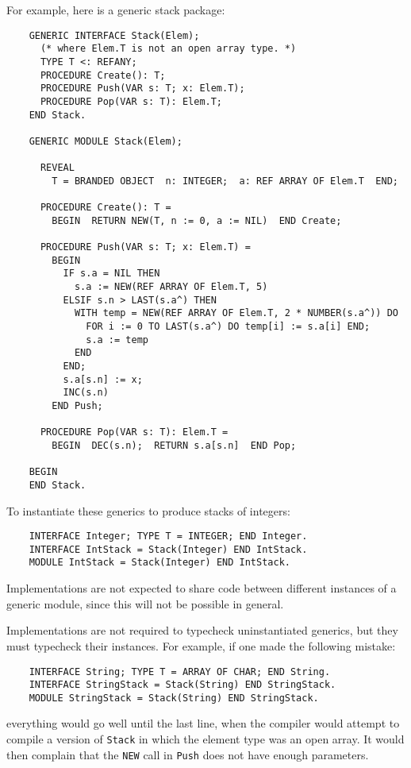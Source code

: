\documentclass[10pt]{article}
\begin{document}
For example, here is a generic stack package:
\begin{verbatim}
    GENERIC INTERFACE Stack(Elem);
      (* where Elem.T is not an open array type. *)
      TYPE T <: REFANY;
      PROCEDURE Create(): T;
      PROCEDURE Push(VAR s: T; x: Elem.T);
      PROCEDURE Pop(VAR s: T): Elem.T;
    END Stack.

    GENERIC MODULE Stack(Elem);

      REVEAL
        T = BRANDED OBJECT  n: INTEGER;  a: REF ARRAY OF Elem.T  END;

      PROCEDURE Create(): T =
        BEGIN  RETURN NEW(T, n := 0, a := NIL)  END Create;

      PROCEDURE Push(VAR s: T; x: Elem.T) =
        BEGIN
          IF s.a = NIL THEN
            s.a := NEW(REF ARRAY OF Elem.T, 5)
          ELSIF s.n > LAST(s.a^) THEN
            WITH temp = NEW(REF ARRAY OF Elem.T, 2 * NUMBER(s.a^)) DO
              FOR i := 0 TO LAST(s.a^) DO temp[i] := s.a[i] END;
              s.a := temp
            END
          END;
          s.a[s.n] := x;
          INC(s.n)
        END Push;

      PROCEDURE Pop(VAR s: T): Elem.T =
        BEGIN  DEC(s.n);  RETURN s.a[s.n]  END Pop;

    BEGIN
    END Stack.
\end{verbatim}
To instantiate these generics to produce stacks of integers:
\begin{verbatim}
    INTERFACE Integer; TYPE T = INTEGER; END Integer.
    INTERFACE IntStack = Stack(Integer) END IntStack.
    MODULE IntStack = Stack(Integer) END IntStack.
\end{verbatim}
Implementations are not expected to share code between different instances of
a generic module, since this will not be possible in general.

Implementations are not required to typecheck uninstantiated generics, but
they must typecheck their instances.  For example, if one made the following
mistake:
\begin{verbatim}
    INTERFACE String; TYPE T = ARRAY OF CHAR; END String.
    INTERFACE StringStack = Stack(String) END StringStack.
    MODULE StringStack = Stack(String) END StringStack.
\end{verbatim}
everything would go well until the last line, when the compiler would attempt
to compile a version of \verb|Stack| in which the element type was an open
array.  It would then complain that the \verb|NEW| call in \verb|Push| does
not have enough parameters.
\end{document}
